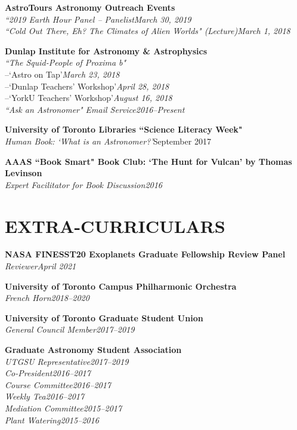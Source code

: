 \documentclass[10pt]{res} %
\begin{document}
\begin{resume}
\textbf{AstroTours Astronomy Outreach Events}\\
{\sl ``2019 Earth Hour Panel -- Panelist}\hfill{\sl March 30, 2019}\\
{\sl ``Cold Out There, Eh? The Climates of Alien Worlds" (Lecture)}\hfill{\sl March 1, 2018}%

\textbf{Dunlap Institute for Astronomy \& Astrophysics}\\
{\sl ``The Squid-People of Proxima b"}\\
 {--\hspace{10mm}`Astro on Tap'}\hfill{\sl March 23, 2018}\\
 {--\hspace{10mm}`Dunlap Teachers' Workshop'}\hfill{\sl April 28, 2018}\\
 {--\hspace{10mm}`YorkU Teachers' Workshop'}\hfill{\sl August 16, 2018}\\
{\sl ``Ask an Astronomer" Email Service}\hfill{\sl 2016--Present}%

\textbf{University of Toronto Libraries ``Science Literacy Week"}\\
{\sl Human Book: `What is an Astronomer?'}\hfill{September 2017}

\textbf{AAAS ``Book Smart" Book Club: `The Hunt for Vulcan' by Thomas Levinson}\\
{\sl Expert Facilitator for Book Discussion}\hfill{\sl 2016}

\section{EXTRA-CURRICULARS} 
% 
\textbf{NASA FINESST20 Exoplanets Graduate Fellowship Review Panel}\\
{\sl Reviewer}\hfill{\sl April 2021}

 \textbf{University of Toronto Campus Philharmonic Orchestra}\\
{\sl French Horn}\hfill{\sl 2018--2020}

\textbf{University of Toronto Graduate Student Union}\\
{\sl General Council Member}\hfill{\sl 2017--2019}

\textbf{Graduate Astronomy Student Association}\\
{\sl UTGSU Representative}\hfill{\sl 2017--2019}\\
{\sl Co-President}\hfill{\sl 2016--2017}\\
{\sl Course Committee}\hfill{\sl 2016--2017}\\
{\sl Weekly Tea}\hfill{\sl 2016--2017}\\
{\sl Mediation Committee}\hfill{\sl 2015--2017}\\
{\sl Plant Watering}\hfill{\sl 2015--2016}


\end{resume}
\end{document}
